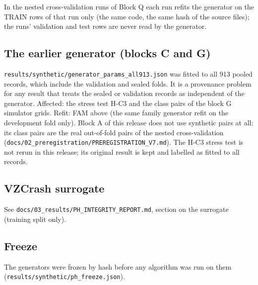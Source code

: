 In the nested cross-validation runs of Block Q each run refits the generator on the TRAIN rows of that run only (the same code, the same hash of the source files); the runs' validation and test rows are never read by the generator.

\subsection*{The earlier generator (blocks C and G)}

\texttt{results/synthetic/generator\_params\_all913.json} was fitted to all 913 pooled records, which include the validation and sealed folds. It is a provenance problem for any result that treats the sealed or validation records as independent of the generator. Affected: the stress test H-C3 and the class pairs of the block G simulator grids. Refit: FAM above (the same family generator refit on the development fold only). Block A of this release does not use synthetic pairs at all: its class pairs are the real out-of-fold pairs of the nested cross-validation (\texttt{docs/02\_preregistration/PREREGISTRATION\_V7.md}). The H-C3 stress test is not rerun in this release; its original result is kept and labelled as fitted to all records.

\subsection*{VZCrash surrogate}

See \texttt{docs/03\_results/PH\_INTEGRITY\_REPORT.md}, section on the surrogate (training split only).

\subsection*{Freeze}

The generators were frozen by hash before any algorithm was run on them (\texttt{results/synthetic/ph\_freeze.json}).

